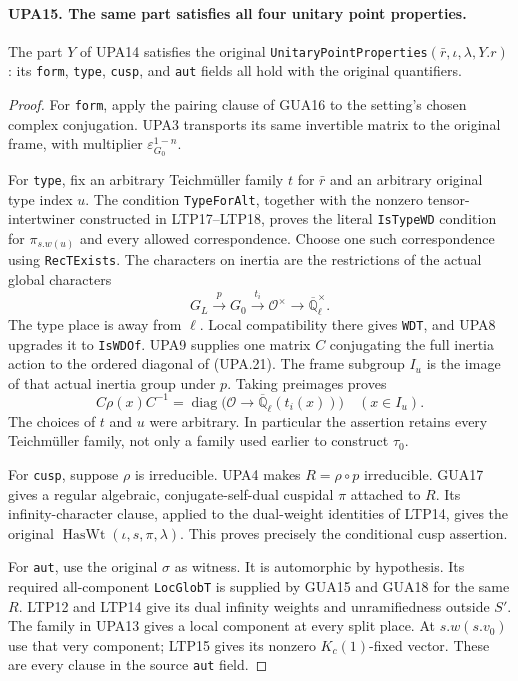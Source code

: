 \paragraph{UPA15. The same part satisfies all four unitary point properties.}
\label{claim:UPA15}
The part $Y$ of UPA14 satisfies the original
\texttt{UnitaryPointProperties}$(\bar r,\iota,\lambda,Y.r)$:
its \texttt{form}, \texttt{type}, \texttt{cusp}, and
\texttt{aut} fields all hold with the original quantifiers.
\begin{proof}
For \texttt{form}, apply the pairing clause of
GUA16 to the setting's chosen complex
conjugation.  UPA3 transports its same invertible matrix
to the original frame, with multiplier
$\varepsilon_{G_0}^{1-n}$.

For \texttt{type}, fix an arbitrary Teichm\"uller family
$t$ for $\bar r$ and an arbitrary original type index $u$.
The condition \texttt{TypeForAlt}, together with the
nonzero tensor-intertwiner constructed in
LTP17--LTP18, proves the literal
\texttt{IsTypeWD} condition for $\pi_{s.w(u)}$ and
every allowed correspondence.  Choose one such
correspondence using \texttt{RecTExists}.  The characters
on inertia are the restrictions of the actual global
characters
\[
 G_L\xrightarrow{p}G_0\xrightarrow{t_i}\mathcal O^\times
       \longrightarrow\overline{\mathbb Q}_\ell^\times.
 \tag{UPA.21}
\]
The type place is away from $\ell$.  Local compatibility
there gives \texttt{WDT}, and UPA8 upgrades it to
\texttt{IsWDOf}.  UPA9 supplies one matrix $C$ conjugating
the full inertia action to the ordered diagonal of (UPA.21).
The frame subgroup $I_u$ is the image of that actual
inertia group under $p$.  Taking preimages proves
\[
 C\rho(x)C^{-1}
       =\operatorname{diag}\bigl(\mathcal O\to
                       \overline{\mathbb Q}_\ell(t_i(x))\bigr)
       \quad(x\in I_u).
 \tag{UPA.22}
\]
The choices of $t$ and $u$ were arbitrary.  In particular
the assertion retains every Teichm\"uller family, not
only a family used earlier to construct $\tau_0$.

For \texttt{cusp}, suppose $\rho$ is irreducible.
UPA4 makes $R=\rho\circ p$ irreducible.
GUA17 gives a regular algebraic,
conjugate-self-dual cuspidal $\pi$ attached to $R$.
Its infinity-character clause, applied to the dual-weight
identities of LTP14, gives the original
$\operatorname{HasWt}(\iota,s,\pi,\lambda)$.
This proves precisely the conditional cusp assertion.

For \texttt{aut}, use the original $\sigma$ as witness.
It is automorphic by hypothesis.  Its required
all-component \texttt{LocGlobT} is supplied by
GUA15 and GUA18 for the same $R$.  LTP12 and LTP14
give its dual infinity weights and unramifiedness
outside $S'$.  The family in UPA13 gives a local component
at every split place.  At $s.w(s.v_0)$ use that very
component; LTP15
gives its nonzero $K_c(1)$-fixed vector.
These are every clause in the source \texttt{aut} field.
\end{proof}

